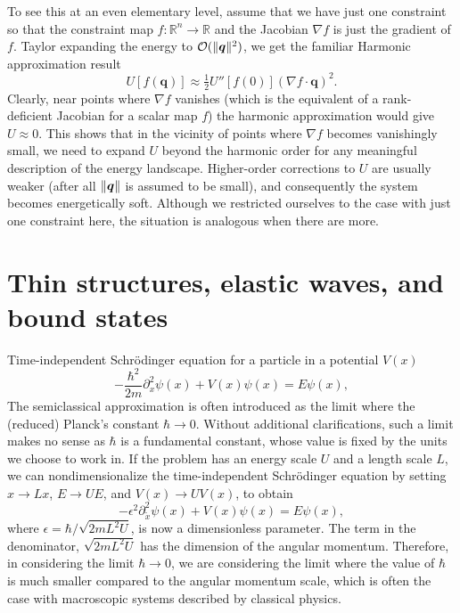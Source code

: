 To see this at an even elementary level, assume that we have just one constraint so that the constraint map $f: \mathbb{R}^{n} \to \mathbb{R}$ and the Jacobian $\nabla f$ is just the gradient of $f$.
Taylor expanding the energy to $\mathcal{O}(\lVert\bm{q}\rVert^{2})$, we get the familiar Harmonic approximation result
%
\begin{equation}
  U[f(\bm{q})] \approx \tfrac{1}{2}U''\left[f(0)\right]\left(\nabla f\cdot \bm{q}\right)^{2}.
\end{equation}
%
Clearly, near points where $\nabla f$ vanishes (which is the equivalent of a rank-deficient Jacobian for a scalar map $f$) the harmonic approximation would give $U \approx 0$.
This shows that in the vicinity of points where $\nabla f$ becomes vanishingly small, we need to expand $U$ beyond the harmonic order for any meaningful description of the energy landscape.
Higher-order corrections to $U$ are usually weaker (after all $\lVert\bm{q}\rVert$ is assumed to be small), and consequently the system becomes energetically soft.
Although we restricted ourselves to the case with just one constraint here, the situation is analogous when there are more.


\section{Thin structures, elastic waves, and bound states}

Time-independent Schr\"{o}dinger equation for a particle in a potential $V(x)$
%
\begin{equation}
  -\frac{\hbar^{2}}{2m}\partial_{x}^{2}\psi(x) + V(x)\psi(x) = E\psi(x),
\end{equation}
%
The semiclassical approximation is often introduced as the limit where the (reduced) Planck's constant $\hbar \to 0$.
Without additional clarifications, such a limit makes no sense as $\hbar$ is a fundamental constant, whose value is fixed by the units we choose to work in.
If the problem has an energy scale $U$ and a length scale $L$, we can nondimensionalize the time-independent Schr\"{o}dinger equation by setting $x \to Lx$, $E \to UE$, and $V(x) \to UV(x)$, to obtain
%
\begin{equation}
  -\epsilon^{2}\partial_{\tilde{x}}^{2}\psi(x) + V(x)\psi(x) = E\psi(x),
\end{equation}
where $\epsilon = \hbar/\sqrt{2mL^{2}U}$, is now a dimensionless parameter.
The term in the denominator, $\sqrt{2mL^{2}U}$ has the dimension of the angular momentum.
Therefore, in considering the limit $\hbar \to 0$, we are considering the limit where the value of $\hbar$ is much smaller compared to the angular momentum scale, which is often the case with macroscopic systems described by classical physics.

